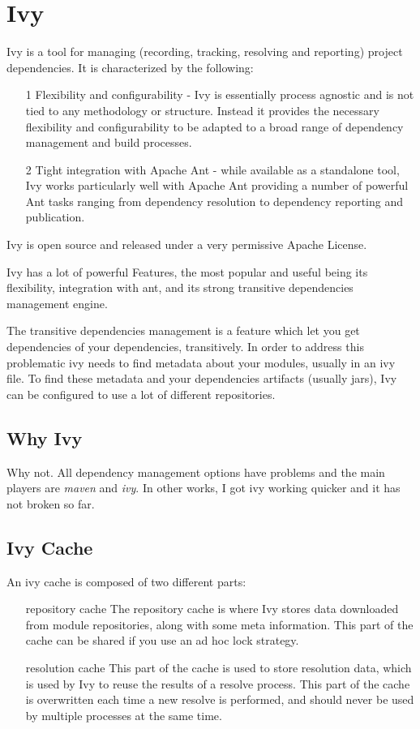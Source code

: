 \section{Ivy}
Ivy is a tool for managing (recording, tracking, resolving and reporting) project
dependencies. It is characterized by the following:

\begin{enumerate}
 \item[1] Flexibility and configurability - Ivy is essentially process agnostic and is
not tied to any methodology or structure. Instead it provides the necessary flexibility
and configurability to be adapted to a broad range of dependency management and build
processes.
\item[2] Tight integration with Apache Ant - while available as a standalone tool, Ivy
works particularly well with Apache Ant providing a number of powerful Ant tasks ranging
from dependency resolution to dependency reporting and publication.
\end{enumerate}

Ivy is open source and released under a very permissive Apache License.

Ivy has a lot of powerful Features, the most popular and useful being its flexibility,
integration with ant, and its strong transitive dependencies management engine.

The transitive dependencies management is a feature which let you get dependencies
of your dependencies, transitively. In order to address this problematic ivy needs
to find metadata about your modules, usually in an ivy file. To find these metadata
and your dependencies artifacts (usually jars), Ivy can be configured to use a lot
of different repositories.

\subsection{Why Ivy}
Why not. All dependency management options have problems and the main players are 
\emph{maven} and \emph{ivy}. In other works, I got ivy working quicker and it has
not broken so far.

\subsection{Ivy Cache}
An ivy cache is composed of two different parts:
\begin{enumerate}
 \item [repository cache] The repository cache is where Ivy stores data downloaded
from module repositories, along with some meta information. This part of the cache
can be shared if you use an ad hoc lock strategy.
 \item[resolution cache] This part of the cache is used to store resolution data,
which is used by Ivy to reuse the results of a resolve process. This part of the
cache is overwritten each time a new resolve is performed, and should never be
used by multiple processes at the same time. 
\end{enumerate}

